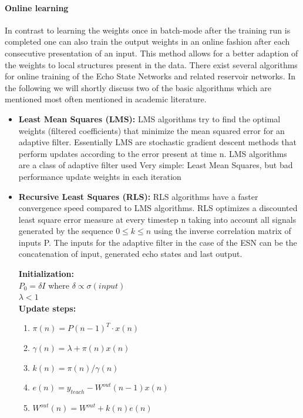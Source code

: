 \paragraph*{Online learning}
In contrast to learning the weights once in batch-mode after the training run is completed one can also train the output weights in an online fashion after each consecutive presentation of an input. This method allows for a better adaption of the weights to local structures present in the data. There exist several algorithms for online training of the Echo State Networks and related reservoir networks. In the following we will shortly discuss two of the basic algorithms which are mentioned most often mentioned in academic literature. 
\begin{itemize}
\item \textbf{Least Mean Squares (LMS):} LMS algorithms try to find the optimal weights (filtered coefficients) that minimize the mean squared error for an adaptive filter. Essentially LMS are stochastic gradient descent methods that perform updates according to the error present at time n.  LMS algorithms are a class of adaptive filter used 
Very simple: Least Mean Squares, but bad performance
update weights in each iteration
\item \textbf{Recursive Least Squares (RLS):} RLS algorithms have a faster convergence speed compared to LMS algorithms. RLS optimizes a discounted least square error measure at every timestep n taking into account all signals generated by the sequence $0 \leq k \leq n$ using the inverse correlation matrix of inputs P. The inputs for the adaptive filter in the case of the ESN can be the concatenation of input, generated echo states and last output.\vspace{10pt}
\indent
\begin{algorithm}[H]
\textbf{Initialization:}\\
$P_0 = \delta I$ where $\delta \propto \sigma(input)$\\
$\lambda < 1$\\
\textbf{Update steps:}\\
\begin{enumerate}
\item $\pi(n) = P(n-1)^T \cdot x(n)$
\item $\gamma(n) = \lambda + \pi(n)x(n)$
\item $k(n) = \pi(n)/\gamma(n)$
\item $e(n) = y_{teach}-W^{out}(n-1)x(n)$
\item $W^{out}(n)=W^{out}+k(n)e(n)$

\end{enumerate}
\end{algorithm}
\end{itemize}
